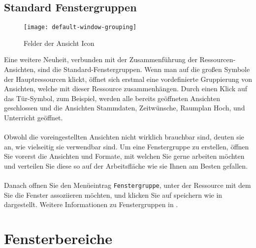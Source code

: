 \newpage

\subsection{Standard Fenstergruppen}
\label{sec:standard-fenstergruppen}

\begin{wrapfigure}{r}{0.41\textwidth}
	\vspace{-14pt}
	\centering
	\texttt{[image: default-window-grouping]}
	\vspace{-5pt}
	\caption{Felder der Ansicht Icon}
	\label{fig:default-window-grouping}
\end{wrapfigure}

Eine weitere Neuheit, verbunden mit der Zusammenführung der Ressourcen-Ansichten, sind die Standard-Fenstergruppen. Wenn man auf die großen Symbole der Hauptressourcen klickt, öffnet sich erstmal eine vordefinierte Gruppierung von Ansichten, welche mit dieser Ressource zusammenhängen. Durch einen Klick auf das Tür-Symbol, zum Beispiel, werden alle bereits geöffneten Ansichten geschlossen und die Ansichten Stammdaten, Zeitwünsche, Raumplan Hoch, und Unterricht geöffnet.\\
\\
Obwohl die voreingestellten Ansichten nicht wirklich brauchbar sind, deuten sie an,  wie vielseitig sie verwendbar sind. Um eine Fenstergruppe zu erstellen, öffnen Sie vorerst die Ansichten und Formate, mit welchen Sie gerne arbeiten möchten und verteilen Sie diese so auf der Arbeitsfläche wie sie Ihnen am Besten gefallen.\\
\\
Danach offnen Sie den Menüeintrag \texttt{Fenstergruppe}, unter der Ressource mit dem Sie die Fenster assoziieren möchten, und klicken Sie auf speichern wie in  dargestellt. Weitere Informationen zu Fenstergruppen in .

\section{Fensterbereiche}
\label{sec:fensterbereiche}

